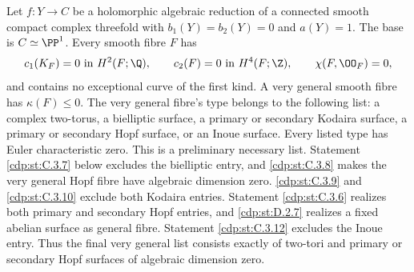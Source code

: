 \begin{proposition}\hypertarget{tag-01F4}{}\label{cdp:st:C.3.1}

Let $f:Y\to C$ be a holomorphic algebraic reduction of a connected
smooth compact complex threefold with $b_1(Y)=b_2(Y)=0$ and $a(Y)=1$.
The base is $C\simeq\PP^1$. Every smooth fibre $F$ has
\[
 c_1(K_F)=0\text{ in }H^2(F;\Q),\qquad
 c_2(F)=0\text{ in }H^4(F;\Z),\qquad
 \chi(F,\OO_F)=0,
\]
and contains no exceptional curve of the first kind. A very general
smooth fibre has $\kappa(F)\leq0$. The very general fibre's type belongs to the following
list: a complex two-torus, a bielliptic surface, a primary or secondary
Kodaira surface, a primary or secondary Hopf surface, or an Inoue
surface. Every listed type has Euler characteristic zero. This is a
preliminary necessary list. Statement \ref{cdp:st:C.3.7} below excludes the
bielliptic entry, and \ref{cdp:st:C.3.8} makes the very general Hopf fibre have
algebraic dimension zero. \ref{cdp:st:C.3.9} and \ref{cdp:st:C.3.10} exclude both Kodaira
entries. Statement \ref{cdp:st:C.3.6} realizes both primary and secondary Hopf
entries, and \ref{cdp:st:D.2.7} realizes a fixed abelian surface as general
fibre. Statement \ref{cdp:st:C.3.12} excludes the Inoue entry. Thus the
final very general list consists exactly of two-tori and
primary or secondary Hopf surfaces of algebraic dimension zero.
\end{proposition}


